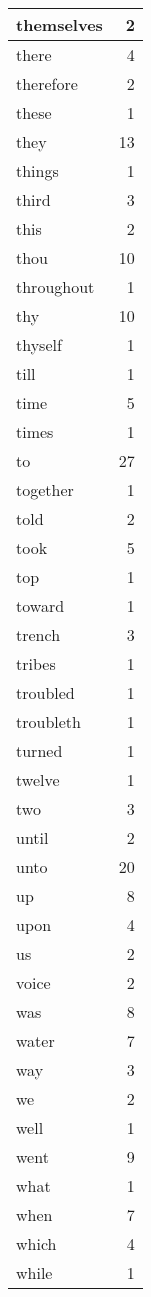 \begin{center}
\begin{longtable}{l|r}
themselves & 2\\ \hline 
there & 4\\ \hline 
therefore & 2\\ \hline 
these & 1\\ \hline 
they & 13\\ \hline 
things & 1\\ \hline 
third & 3\\ \hline 
this & 2\\ \hline 
thou & 10\\ \hline 
throughout & 1\\ \hline 
thy & 10\\ \hline 
thyself & 1\\ \hline 
till & 1\\ \hline 
time & 5\\ \hline 
times & 1\\ \hline 
to & 27\\ \hline 
together & 1\\ \hline 
told & 2\\ \hline 
took & 5\\ \hline 
top & 1\\ \hline 
toward & 1\\ \hline 
trench & 3\\ \hline 
tribes & 1\\ \hline 
troubled & 1\\ \hline 
troubleth & 1\\ \hline 
turned & 1\\ \hline 
twelve & 1\\ \hline 
two & 3\\ \hline 
until & 2\\ \hline 
unto & 20\\ \hline 
up & 8\\ \hline 
upon & 4\\ \hline 
us & 2\\ \hline 
voice & 2\\ \hline 
was & 8\\ \hline 
water & 7\\ \hline 
way & 3\\ \hline 
we & 2\\ \hline 
well & 1\\ \hline 
went & 9\\ \hline 
what & 1\\ \hline 
when & 7\\ \hline 
which & 4\\ \hline 
while & 1\\ \hline 

\end{longtable}
\end{center}
